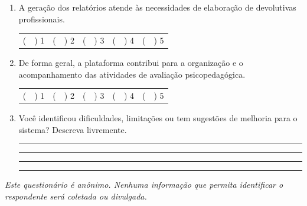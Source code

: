 \begin{enumerate}
    \bigskip

    \item A geração dos relatórios atende às necessidades de elaboração de devolutivas profissionais.

    \bigskip
    \noindent
    \begin{tabular}{ccccc}
        \quad(\ \ ) 1 \quad & \quad(\ \ ) 2 \quad & \quad(\ \ ) 3 \quad & \quad(\ \ ) 4 \quad & \quad(\ \ ) 5 \quad
    \end{tabular}

    \bigskip

    \item De forma geral, a plataforma contribui para a organização e o acompanhamento das atividades de avaliação psicopedagógica.

    \bigskip
    \noindent
    \begin{tabular}{ccccc}
        \quad(\ \ ) 1 \quad & \quad(\ \ ) 2 \quad & \quad(\ \ ) 3 \quad & \quad(\ \ ) 4 \quad & \quad(\ \ ) 5 \quad
    \end{tabular}

    \bigskip

    \item Você identificou dificuldades, limitações ou tem sugestões de melhoria para o sistema? Descreva livremente.

    \bigskip
    \noindent\rule{\textwidth}{0.4pt}

    \bigskip
    \noindent\rule{\textwidth}{0.4pt}

    \bigskip
    \noindent\rule{\textwidth}{0.4pt}

    \bigskip
    \noindent\rule{\textwidth}{0.4pt}

\end{enumerate}

\bigskip
\noindent\textit{Este questionário é anônimo. Nenhuma informação que permita identificar o respondente será coletada ou divulgada.}